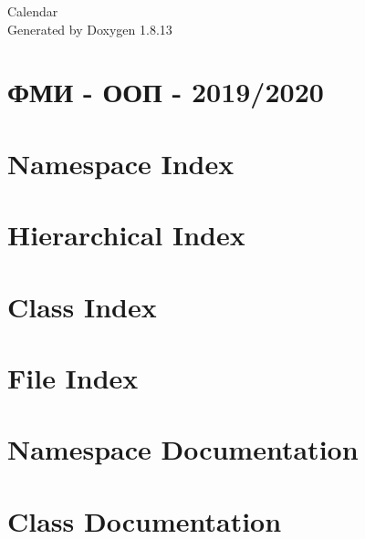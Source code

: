 \documentclass[twoside]{book}
\newcommand{\+}{\discretionary{\mbox{\scriptsize$\hookleftarrow$}}{}{}}
\newcommand{\clearemptydoublepage}{%
  \newpage{\pagestyle{empty}\cleardoublepage}%
}
\begin{document}
\hypersetup{pageanchor=false,
             bookmarksnumbered=true,
             pdfencoding=unicode
            }
\begin{titlepage}
\vspace*{7cm}
\begin{center}%
{\Large Calendar }\\
\vspace*{1cm}
{\large Generated by Doxygen 1.8.13}\\
\end{center}
\end{titlepage}
\clearemptydoublepage
{}
\tableofcontents
\clearemptydoublepage
{}
\hypersetup{pageanchor=true}

\chapter{ФМИ -\/ ООП -\/ 2019/2020}
\label{index}\hypertarget{index}{}
\chapter{Namespace Index}

\chapter{Hierarchical Index}

\chapter{Class Index}

\chapter{File Index}

\chapter{Namespace Documentation}

\chapter{Class Documentation}


























\end{document}
